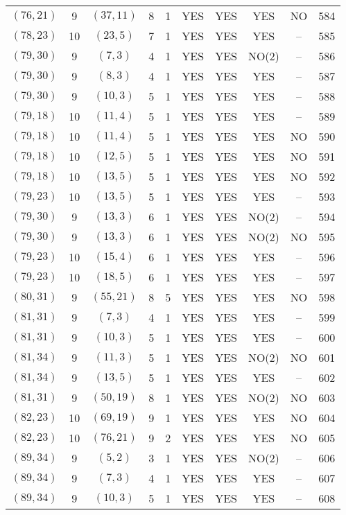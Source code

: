 \begin{longtable}{|c|c|c|c|c|c|c|c|c|c|}
$(76, 21)$ & 9 & $(37, 11)$ & 8 & 1 & YES & YES & YES & NO & 584\\
$(78, 23)$ & 10 & $(23, 5)$ & 7 & 1 & YES & YES & YES & -- & 585\\
$(79, 30)$ & 9 & $(7, 3)$ & 4 & 1 & YES & YES & NO(2) & -- & 586\\
$(79, 30)$ & 9 & $(8, 3)$ & 4 & 1 & YES & YES & YES & -- & 587\\
$(79, 30)$ & 9 & $(10, 3)$ & 5 & 1 & YES & YES & YES & -- & 588\\
$(79, 18)$ & 10 & $(11, 4)$ & 5 & 1 & YES & YES & YES & -- & 589\\
$(79, 18)$ & 10 & $(11, 4)$ & 5 & 1 & YES & YES & YES & NO & 590\\
$(79, 18)$ & 10 & $(12, 5)$ & 5 & 1 & YES & YES & YES & NO & 591\\
$(79, 18)$ & 10 & $(13, 5)$ & 5 & 1 & YES & YES & YES & NO & 592\\
$(79, 23)$ & 10 & $(13, 5)$ & 5 & 1 & YES & YES & YES & -- & 593\\
$(79, 30)$ & 9 & $(13, 3)$ & 6 & 1 & YES & YES & NO(2) & -- & 594\\
$(79, 30)$ & 9 & $(13, 3)$ & 6 & 1 & YES & YES & NO(2) & NO & 595\\
$(79, 23)$ & 10 & $(15, 4)$ & 6 & 1 & YES & YES & YES & -- & 596\\
$(79, 23)$ & 10 & $(18, 5)$ & 6 & 1 & YES & YES & YES & -- & 597\\
$(80, 31)$ & 9 & $(55, 21)$ & 8 & 5 & YES & YES & YES & NO & 598\\
$(81, 31)$ & 9 & $(7, 3)$ & 4 & 1 & YES & YES & YES & -- & 599\\
$(81, 31)$ & 9 & $(10, 3)$ & 5 & 1 & YES & YES & YES & -- & 600\\
$(81, 34)$ & 9 & $(11, 3)$ & 5 & 1 & YES & YES & NO(2) & NO & 601\\
$(81, 34)$ & 9 & $(13, 5)$ & 5 & 1 & YES & YES & YES & -- & 602\\
$(81, 31)$ & 9 & $(50, 19)$ & 8 & 1 & YES & YES & NO(2) & NO & 603\\
$(82, 23)$ & 10 & $(69, 19)$ & 9 & 1 & YES & YES & YES & NO & 604\\
$(82, 23)$ & 10 & $(76, 21)$ & 9 & 2 & YES & YES & YES & NO & 605\\
$(89, 34)$ & 9 & $(5, 2)$ & 3 & 1 & YES & YES & NO(2) & -- & 606\\
$(89, 34)$ & 9 & $(7, 3)$ & 4 & 1 & YES & YES & YES & -- & 607\\
$(89, 34)$ & 9 & $(10, 3)$ & 5 & 1 & YES & YES & YES & -- & 608\\

\end{longtable}
